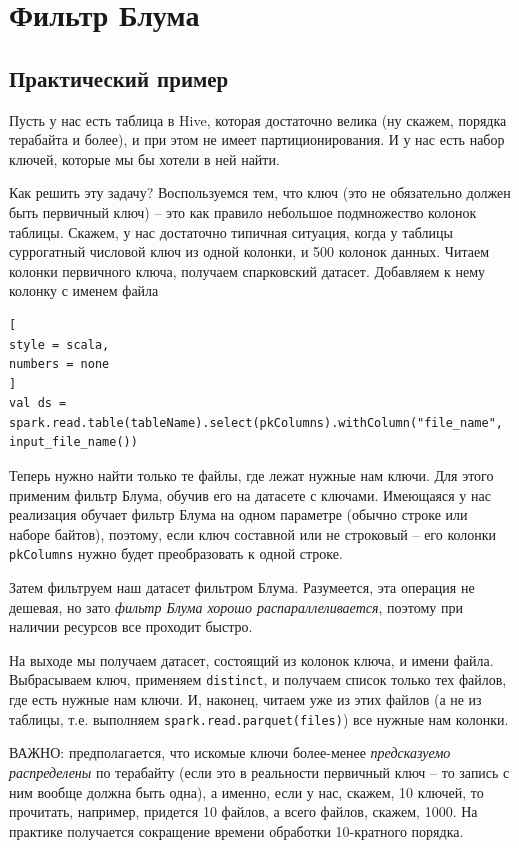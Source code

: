 \documentclass[%
	11pt,
	a4paper,
	utf8,
		]{article}
\begin{document}
\section{Фильтр Блума}

\subsection{Практический пример}

Пусть у нас есть таблица в Hive, которая достаточно велика (ну скажем, порядка терабайта и более), и при этом не имеет партиционирования. И у нас есть набор ключей, которые мы бы хотели в ней найти.

Как решить эту задачу? Воспользуемся тем, что ключ (это не обязательно должен быть первичный ключ) -- это как правило небольшое подмножество колонок таблицы. Скажем, у нас достаточно типичная ситуация, когда у таблицы суррогатный числовой ключ из одной колонки, и 500 колонок данных. Читаем колонки первичного ключа, получаем спарковский датасет. Добавляем к нему колонку с именем файла
\begin{lstlisting}[
style = scala,
numbers = none	
]
val ds = spark.read.table(tableName).select(pkColumns).withColumn("file_name", input_file_name())
\end{lstlisting}

Теперь нужно найти только те файлы, где лежат нужные нам ключи. Для этого применим фильтр Блума, обучив его на датасете с ключами. Имеющаяся у нас реализация обучает фильтр Блума на одном параметре (обычно строке или наборе байтов), поэтому, если ключ составной или не строковый -- его колонки \texttt{pkColumns} нужно будет преобразовать к одной строке.

Затем фильтруем наш датасет фильтром Блума. Разумеется, эта операция не дешевая, но зато \emph{фильтр Блума хорошо распараллеливается}, поэтому при наличии ресурсов все проходит быстро.

На выходе мы получаем датасет, состоящий из колонок ключа, и имени файла. Выбрасываем ключ, применяем \texttt{distinct}, и получаем список только тех файлов, где есть нужные нам ключи. И, наконец, читаем уже из этих файлов (а не из таблицы, т.е. выполняем \texttt{spark.read.parquet(files)}) все нужные нам колонки.

ВАЖНО: предполагается, что искомые ключи более-менее \emph{предсказуемо распределены} по терабайту (если это в реальности первичный ключ -- то запись с ним вообще должна быть одна), а именно, если у нас, скажем, 10 ключей, то прочитать, например, придется 10 файлов, а всего файлов, скажем, 1000. На практике получается сокращение времени обработки 10-кратного порядка.
\end{document}
